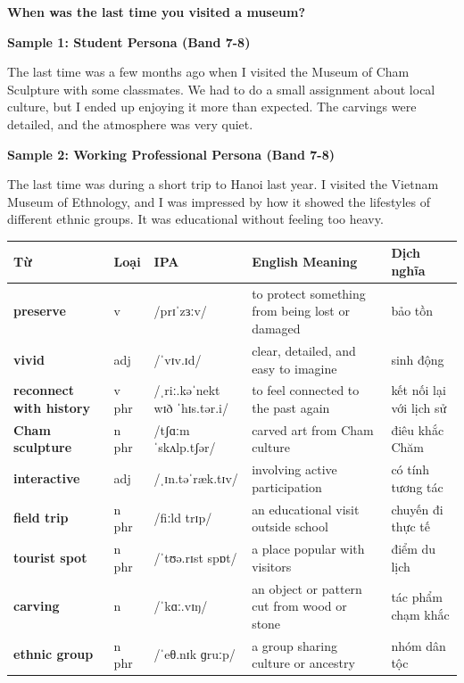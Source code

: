 \separator

\begin{ieltsquestion}
\textbf{When was the last time you visited a museum?}
\end{ieltsquestion}
\textbf{Sample 1: Student Persona (Band 7-8)}

The last time was a few months ago when I visited the Museum of Cham Sculpture with some classmates. We had to do a small assignment about local culture, but I ended up enjoying it more than expected. The carvings were detailed, and the atmosphere was very quiet.

\textbf{Sample 2: Working Professional Persona (Band 7-8)}

The last time was during a short trip to Hanoi last year. I visited the Vietnam Museum of Ethnology, and I was impressed by how it showed the lifestyles of different ethnic groups. It was educational without feeling too heavy.

\separator


\vspace{0.8em}
\begin{center}
\renewcommand{\arraystretch}{1.65}
\begin{tabularx}{\textwidth}{|V{0.22\textwidth}|C{0.07\textwidth}|I{0.20\textwidth}|Y|V{0.18\textwidth}|}
\hline
{}
\textbf{Từ} & \textbf{Loại} & \textbf{IPA} & \textbf{English Meaning} & \textbf{Dịch nghĩa} \\
\hline
\textbf{preserve} & v & /prɪˈzɜːv/ & to protect something from being lost or damaged & bảo tồn \\ \hline
\textbf{vivid} & adj & /ˈvɪv.ɪd/ & clear, detailed, and easy to imagine & sinh động \\ \hline
\textbf{reconnect with history} & v phr & /ˌriː.kəˈnekt wɪð ˈhɪs.tər.i/ & to feel connected to the past again & kết nối lại với lịch sử \\ \hline
\textbf{Cham sculpture} & n phr & /tʃɑːm ˈskʌlp.tʃər/ & carved art from Cham culture & điêu khắc Chăm \\ \hline
\textbf{interactive} & adj & /ˌɪn.təˈræk.tɪv/ & involving active participation & có tính tương tác \\ \hline
\textbf{field trip} & n phr & /fiːld trɪp/ & an educational visit outside school & chuyến đi thực tế \\ \hline
\textbf{tourist spot} & n phr & /ˈtʊə.rɪst spɒt/ & a place popular with visitors & điểm du lịch \\ \hline
\textbf{carving} & n & /ˈkɑː.vɪŋ/ & an object or pattern cut from wood or stone & tác phẩm chạm khắc \\ \hline
\textbf{ethnic group} & n phr & /ˈeθ.nɪk ɡruːp/ & a group sharing culture or ancestry & nhóm dân tộc \\ \hline
\end{tabularx}
\end{center}

